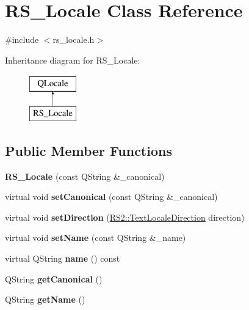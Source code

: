 \hypertarget{classRS__Locale}{\section{R\-S\-\_\-\-Locale Class Reference}
\label{classRS__Locale}
}


{\ttfamily \#include $<$rs\-\_\-locale.\-h$>$}

Inheritance diagram for R\-S\-\_\-\-Locale\-:\begin{figure}[H]
\begin{center}
\leavevmode
\includegraphics[height=2.000000cm]{classRS__Locale}
\end{center}
\end{figure}
\subsection*{Public Member Functions}
\begin{DoxyCompactItemize}
\item 
\hypertarget{classRS__Locale_aee1928bc45c20b653a73414fe212578c}{{\bfseries R\-S\-\_\-\-Locale} (const Q\-String \&\-\_\-canonical)}\label{classRS__Locale_aee1928bc45c20b653a73414fe212578c}

\item 
\hypertarget{classRS__Locale_ac2edf23ca22253482349ea82ffdf977a}{virtual void {\bfseries set\-Canonical} (const Q\-String \&\-\_\-canonical)}\label{classRS__Locale_ac2edf23ca22253482349ea82ffdf977a}

\item 
\hypertarget{classRS__Locale_a6643127c86cc020ac0791ad7d9849163}{virtual void {\bfseries set\-Direction} (\hyperlink{classRS2_a3dafd8c4ebe0b83d1cb0e889429a7a59}{R\-S2\-::\-Text\-Locale\-Direction} direction)}\label{classRS__Locale_a6643127c86cc020ac0791ad7d9849163}

\item 
\hypertarget{classRS__Locale_a9b9caceffbf6796a8dc5332dd794e20b}{virtual void {\bfseries set\-Name} (const Q\-String \&\-\_\-name)}\label{classRS__Locale_a9b9caceffbf6796a8dc5332dd794e20b}

\item 
\hypertarget{classRS__Locale_a47c7c5105bec987598bfa9ff573db63b}{virtual Q\-String {\bfseries name} () const }\label{classRS__Locale_a47c7c5105bec987598bfa9ff573db63b}

\item 
\hypertarget{classRS__Locale_a7d6431e3b402d83b3417875f9138cee1}{Q\-String {\bfseries get\-Canonical} ()}\label{classRS__Locale_a7d6431e3b402d83b3417875f9138cee1}

\item 
\hypertarget{classRS__Locale_a32dc99995a4b3d8a13bd0a08a97d8012}{Q\-String {\bfseries get\-Name} ()}\label{classRS__Locale_a32dc99995a4b3d8a13bd0a08a97d8012}

\end{DoxyCompactItemize}
